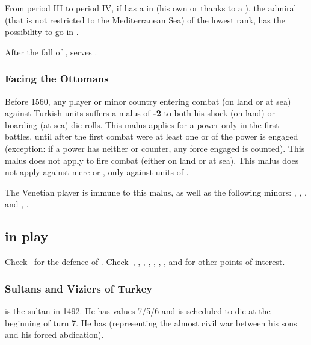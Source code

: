 From period III to period IV, if \TUR has a \TP in 
(his own or thanks to a \dipAT), the admiral (that is not restricted
to the Mediterranean Sea) of the lowest rank, has the possibility to
go in .

 After the fall of \paysMamelouks,
 serves \TUR.

\subsubsection{Facing the Ottomans}\label{chTurkey:Facing Ottomans}
\aparag Before 1560, any player or minor country entering combat (on
land or at sea) against Turkish units suffers a malus of {\bf -2} to
both his shock (on land) or boarding (at sea) die-rolls.
\aparag This malus applies for a power only in the first battles,
until after the first combat were at least one \ARMY or \FLEET of the
power is engaged (exception: if a power has neither \ARMY or \FLEET
counter, any force engaged is counted). This malus does not apply to
fire combat (either on land or at sea). This malus does not apply
against mere \VASSAL or \TUR, only against units of \TUR.

\aparag The Venetian player is immune to this malus, as well as the
following minors: , , ,
 and , .

\subsection{ in play}

Check~ for the defence of
. Check~,
, ,
, ,
, ,
 and 
for other points of interest.

\subsubsection{Sultans and Viziers of Turkey}
\label{chSpecific:Turkey:Vizier}
 is the sultan in 1492. He has
values 7/5/6 and is scheduled to die at the beginning of turn 7.
 He has 
(representing the almost civil war between his sons and his forced
abdication).

